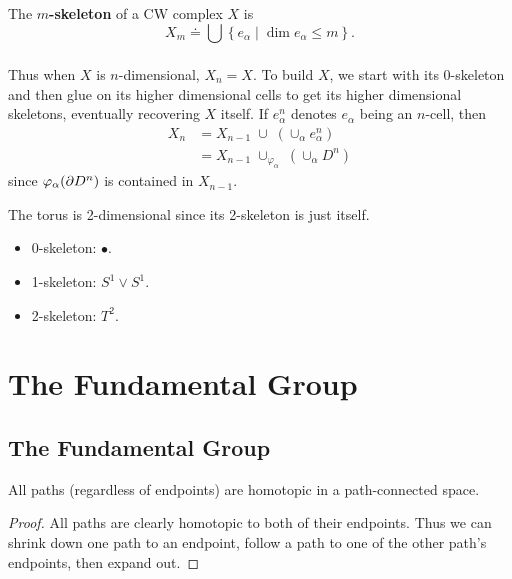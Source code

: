 \documentclass[twoside,10pt]{report}
\begin{document}
\begin{defn}[]
The \textbf{$m$-skeleton} of a CW complex $X$ is
\[
X_{m} \doteq \bigcup_{}\left\{ e_{\alpha}\;|\; \dim e_{\alpha}\leq m \right\}.
\] 
\end{defn}

Thus when $X$ is $n$-dimensional, $X_{n}=X$. To build $X$, we start with its 0-skeleton and then glue on its higher dimensional cells to get its higher dimensional skeletons, eventually recovering $X$ itself. If $e_{\alpha}^{n}$ denotes $e_{\alpha}$ being an $n$-cell, then
\begin{align*}
	X_{n} &= X_{n-1} \;\cup\; (\cup_{\alpha} e_{\alpha}^{n}) \\
	      &= X_{n-1} \;\cup_{\varphi_{\alpha}}\; \left( \cup_{\alpha}D^{n} \right)
\end{align*}
since $\varphi_{\alpha}(\partial D^{n})$ is contained in $X_{n-1}$.

\begin{ex}
	The torus is 2-dimensional since its 2-skeleton is just itself.
	\begin{itemize}
		\item 0-skeleton: $\bullet$.
		\item 1-skeleton: $S^{1}\vee S^{1}$.
		\item 2-skeleton: $T^2$.
	\end{itemize}
\end{ex}



\chapter{The Fundamental Group}

\section{The Fundamental Group}


\begin{prop}
	All paths (regardless of endpoints) are homotopic in a path-connected space.
\end{prop}
\begin{proof}
	All paths are clearly homotopic to both of their endpoints. Thus we can shrink down one path to an endpoint, follow a path to one of the other path's endpoints, then expand out.
\end{proof}
\end{document}
